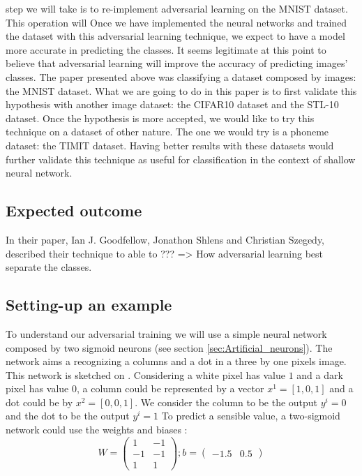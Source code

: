 		step we will take is to re-implement adversarial learning on the MNIST dataset. This operation will 
		Once we have implemented the neural networks and trained the dataset with this adversarial learning technique, we expect to have a model more accurate in predicting the classes. 
		It seems legitimate at this point to believe that adversarial learning will improve the accuracy of predicting images' classes. The paper presented above\cite{goodfellow2014explaining} was classifying a dataset composed by images: the MNIST dataset. What we are going to do in this paper is to first validate this hypothesis with another image dataset: the CIFAR10 dataset\cite{krizhevsky2009learning} and the STL-10 dataset\cite{maybe...}. Once the hypothesis is more accepted, we would like to try this technique on a dataset of other nature. The one we would try is a phoneme dataset: the TIMIT dataset\cite{maybe...}. Having better results with these datasets would further validate this technique as useful for classification in the context of shallow neural network.

	\subsection{Expected outcome}
	
	In their paper, Ian J. Goodfellow, Jonathon Shlens and Christian Szegedy, described their technique to able to ??? 
	=> How adversarial learning best separate the classes.




	\subsection{Setting-up an example}
		To understand our adversarial training we will use a simple neural network composed by two sigmoid neurons (see section \ref{sec:Artificial_neurons}). The network aims a recognizing a columns and a dot in a three by one pixels image. This network is sketched on . Considering a white pixel has value $1$ and a dark pixel has value $0$, a column could be represented by a vector $x^1 = [1,0,1]$ and a dot could be by $x^2 = [0,0,1]$. We consider the column to be the output $y^i = 0$ and the dot to be the output $y^i = 1$
		To predict a sensible value, a two-sigmoid network could use the weights and biases :
		$$ W = \left( \begin{matrix} 1 & -1 \\ -1 & -1 \\ 1 & 1 \end{matrix} \right) ; b = \left( \begin{matrix} -1.5 & 0.5 \end{matrix} \right)$$
		

